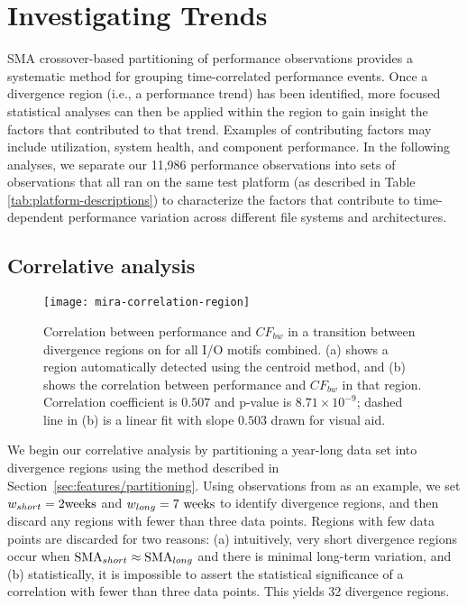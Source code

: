 \section{Investigating Trends}\label{sec:results}

SMA crossover-based partitioning of performance observations provides
a systematic method for grouping time-correlated performance events.
Once a divergence region (i.e., a performance trend) has been identified,
more focused statistical analyses can then be applied within the region
to gain insight the factors that contributed to that trend.  Examples of
contributing factors may include utilization, system health, and component performance.
In the following analyses, we separate our 11,986 performance observations into sets of observations that all ran on the same test platform (as described in Table \ref{tab:platform-descriptions}) to characterize the factors that contribute to time-dependent performance variation across different file systems and architectures.

\subsection{Correlative analysis} \label{sec:results/correlate-mira}

\begin{figure}
    \centering
    \texttt{[image: mira-correlation-region]}
    \vspace{-.35in}
    \caption{Correlation between performance and $CF_{bw}$ in a transition between divergence regions on \mira for all I/O motifs combined.
    (a) shows a region automatically detected using the centroid method, and (b) shows the correlation between performance and $CF_{bw}$ in that region.
    Correlation coefficient is $0.507$ and p-value is ${8.71 \times 10^{-9}}$; dashed line in (b) is a linear fit with slope $0.503$ drawn for visual aid.}
    \label{fig:mira-correlation-region}
\end{figure}


We begin our correlative analysis by partitioning a year-long data set into
divergence regions using the method described in
Section~\ref{sec:features/partitioning}.  Using observations from \mira
\mirafsone as an example, we set $w_{short} = 2 \textup{weeks}$ and $w_{long}
= 7 \textup{ weeks}$ to identify divergence regions, and then discard any
regions with fewer than three data points.  Regions with few data points are discarded
for two reasons: (a) intuitively, very short divergence regions occur
when $\textup{SMA}_{short} \approx \textup{SMA}_{long}$ and there is
minimal long-term variation, and (b) statistically, it is impossible
to assert the statistical significance of a correlation with fewer than
three data points.  This yields 32 divergence regions.


